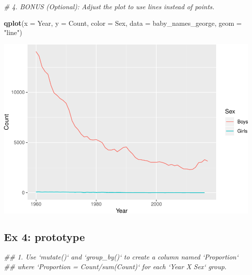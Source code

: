\documentclass[]{book}
\newenvironment{Shaded}{\begin{snugshade}}{\end{snugshade}}
\newcommand{\CommentTok}[1]{\textcolor[rgb]{0.56,0.35,0.01}{\textit{#1}}}
\newcommand{\DataTypeTok}[1]{\textcolor[rgb]{0.13,0.29,0.53}{#1}}
\newcommand{\KeywordTok}[1]{\textcolor[rgb]{0.13,0.29,0.53}{\textbf{#1}}}
\newcommand{\NormalTok}[1]{#1}
\newcommand{\OperatorTok}[1]{\textcolor[rgb]{0.81,0.36,0.00}{\textbf{#1}}}
\newcommand{\StringTok}[1]{\textcolor[rgb]{0.31,0.60,0.02}{#1}}
\begin{document}
\begin{Shaded}
\begin{Highlighting}[]
\CommentTok{# 4.  BONUS (Optional): Adjust the plot to use lines instead of points.}
\end{Highlighting}
\end{Shaded}

\begin{Shaded}
\begin{Highlighting}[]
\KeywordTok{qplot}\NormalTok{(}\DataTypeTok{x =}\NormalTok{ Year, }\DataTypeTok{y =}\NormalTok{ Count, }\DataTypeTok{color =}\NormalTok{ Sex, }\DataTypeTok{data =}\NormalTok{ baby_names_george, }\DataTypeTok{geom =} \StringTok{"line"}\NormalTok{)}
\end{Highlighting}
\end{Shaded}

\includegraphics{R/Rintro/figures/unnamed-chunk-74-1.pdf}

\hypertarget{ex-4-prototype}{%
\subsection{Ex 4: prototype}\label{ex-4-prototype}}

\begin{Shaded}
\begin{Highlighting}[]
\CommentTok{## 1.  Use `mutate()` and `group_by()` to create a column named `Proportion`}
\CommentTok{##     where `Proportion = Count/sum(Count)` for each `Year X Sex` group.}
\end{Highlighting}
\end{Shaded}

\begin{Shaded}
\end{Shaded}
\end{document}
